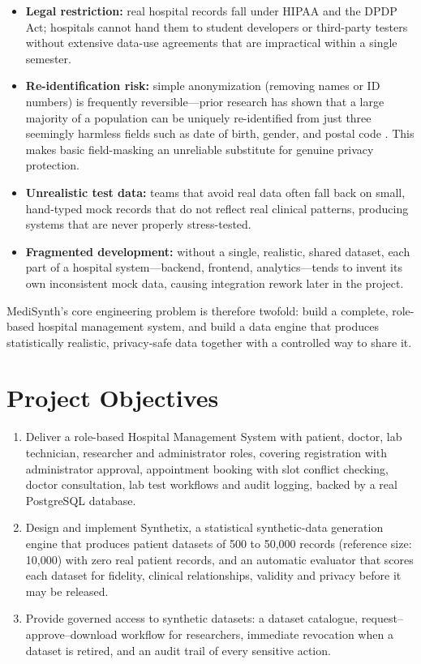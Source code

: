 \documentclass{tietreport}
\begin{document}
\begin{itemize}
  \item \textbf{Legal restriction:} real hospital records fall under HIPAA and
    the DPDP Act; hospitals cannot hand them to student developers or
    third-party testers without extensive data-use agreements that are
    impractical within a single semester.
  \item \textbf{Re-identification risk:} simple anonymization (removing names
    or ID numbers) is frequently reversible---prior research has shown that a
    large majority of a population can be uniquely re-identified from just
    three seemingly harmless fields such as date of birth, gender, and postal
    code \cite{sweeney2000}. This makes basic field-masking an unreliable
    substitute for genuine privacy protection.
  \item \textbf{Unrealistic test data:} teams that avoid real data often fall
    back on small, hand-typed mock records that do not reflect real clinical
    patterns, producing systems that are never properly stress-tested.
  \item \textbf{Fragmented development:} without a single, realistic, shared
    dataset, each part of a hospital system---backend, frontend,
    analytics---tends to invent its own inconsistent mock data, causing
    integration rework later in the project.
\end{itemize}

MediSynth's core engineering problem is therefore twofold: build a complete,
role-based hospital management system, and build a data engine that produces
statistically realistic, privacy-safe data together with a controlled way to
share it.

\section{Project Objectives}

\begin{enumerate}
  \item Deliver a role-based Hospital Management System with patient,
    doctor, lab technician, researcher and administrator roles, covering
    registration with administrator approval, appointment booking with slot
    conflict checking, doctor consultation, lab test workflows and audit
    logging, backed by a real PostgreSQL database.
  \item Design and implement Synthetix, a statistical synthetic-data
    generation engine that produces patient datasets of 500 to 50,000 records
    (reference size: 10,000) with zero real patient records, and an
    automatic evaluator that scores each dataset for fidelity, clinical
    relationships, validity and privacy before it may be released.
  \item Provide governed access to synthetic datasets: a dataset catalogue,
    request--approve--download workflow for researchers, immediate revocation
    when a dataset is retired, and an audit trail of every sensitive action.
\end{enumerate}
\end{document}
